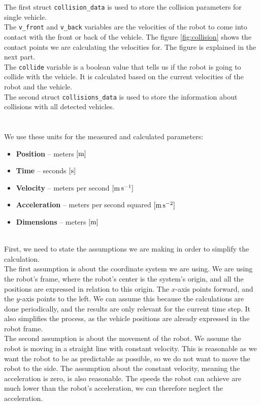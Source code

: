         The first struct \texttt{collision\_data} is used to store the collision parameters for single vehicle.\\
        The \texttt{v\_front} and \texttt{v\_back} variables are the velocities of the robot to come into contact with the front or back of the vehicle. The figure \ref{fig:collision} shows the contact points we are calculating the velocities for. The figure is explained in the next part.\\
        The \texttt{collide} variable is a boolean value that tells us if the robot is going to collide with the vehicle. It is calculated based on the current velocities of the robot and the vehicle.\\
        The second struct \texttt{collisions\_data} is used to store the information about collisions with all detected vehicles.\\\\
    \\
        We use these units for the measured and calculated parameters:
        \begin{itemize}
            \item \textbf{Position} -- meters $[\rm{m}]$
            \item \textbf{Time} -- seconds $[\rm{s}]$
            \item \textbf{Velocity} -- meters per second $[\rm{m\,s^{-1}}]$
            \item \textbf{Acceleration} -- meters per second squared $[\rm{m\,s^{-2}}]$
            \item \textbf{Dimensions} -- meters $[\rm{m}]$
        \end{itemize}
    \\
        First, we need to state the assumptions we are making in order to simplify the calculation.\\
        The first assumption is about the coordinate system we are using. We are using the robot's frame, where the robot's center is the system's origin, and all the positions are expressed in relation to this origin. The $x$-axis points forward, and the $y$-axis points to the left. We can assume this because the calculations are done periodically, and the results are only relevant for the current time step. It also simplifies the process, as the vehicle positions are already expressed in the robot frame.\\
        The second assumption is about the movement of the robot. We assume the robot is moving in a straight line with constant velocity. This is reasonable as we want the robot to be as predictable as possible, so we do not want to move the robot to the side. The assumption about the constant velocity, meaning the acceleration is zero, is also reasonable. The speeds the robot can achieve are much lower than the robot's acceleration, we can therefore neglect the acceleration.\\

